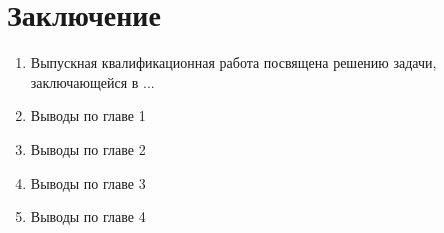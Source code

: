 {}

\section*{Заключение}

\begin{enumerate} [nosep, left = 0pt]
	
	\item Выпускная квалификационная работа посвящена решению задачи, заключающейся в ...
	\item Выводы по главе 1
	\item Выводы по главе 2
	\item Выводы по главе 3
	\item Выводы по главе 4 
	
\end{enumerate}